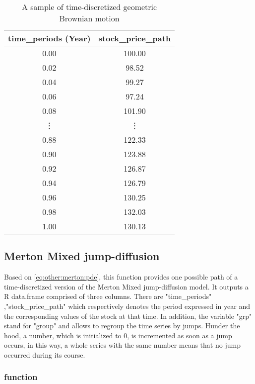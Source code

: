 \documentclass[12pt]{report}
\begin{document}
\begin{appendices}
\begin{table}[H]
\begin{tabular}{cc}
  \hline
 time\_periods (Year) & stock\_price\_path \\ 
  \hline
 0.00 & 100.00 \\ 
 0.02 & 98.52 \\ 
 0.04 & 99.27 \\ 
 0.06 & 97.24 \\ 
 0.08 & 101.90 \\ 
 \vdots & \vdots \\
 0.88 & 122.33 \\ 
 0.90 & 123.88 \\ 
 0.92 & 126.87 \\ 
 0.94 & 126.79 \\ 
 0.96 & 130.25 \\ 
 0.98 & 132.03 \\ 
 1.00 & 130.13 \\ 
   \hline
\end{tabular}
\caption{A sample of time-discretized geometric Brownian motion}
\end{table}





\subsection{Merton Mixed jump-diffusion}
\label{sub:r:time:merton}

Based on \cref{eq:other:merton:pde}, this function provides one possible path of a time-discretized version of the Merton Mixed jump-diffusion model.
It outputs a R data.frame comprised of three columns. 
There are "time\_periods" ,"stock\_price\_path" which respectively denotes the period expressed in year and the corresponding values of the stock at that time.
In addition, the variable "grp" stand for "group" and allows to regroup the time series by jumps. Hunder the hood, a number, which is initialized to 0, is incremented as soon as a jump occurs, in this way, a whole series with the same number means that no jump occurred during its course.

\subsubsection*{function}


\end{appendices}
\end{document}
